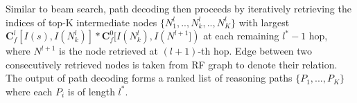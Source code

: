 Similar to beam search, path decoding then proceeds by iteratively retrieving the indices of top-K intermediate nodes $\{N_1^l,..,N_k^l,..,N_K^l\}$ with largest $\bm{C}_f^l[I(s), I(N_k^l)]*\bm{C}_f^0[I(N_k^l), I(N^{l+1}])$ at each remaining $l^*-1$ hop, where $N^{l+1}$ is the node retrieved at $(l+1)$-th hop. Edge between two consecutively retrieved nodes is taken from RF graph to denote their relation. The output of path decoding forms a ranked list of reasoning paths $\{P_1,...,P_K\}$ where each $P_i$ is of length $l^*$.
																					
